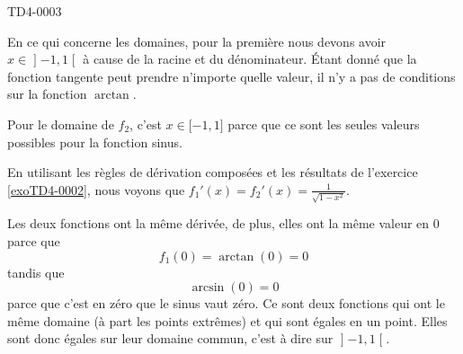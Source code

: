 
\begin{corrige}{TD4-0003}

	En ce qui concerne les domaines, pour la première nous devons avoir $x\in\mathopen] -1 , 1 \mathclose[$ à cause de la racine et du dénominateur. Étant donné que la fonction tangente peut prendre n'importe quelle valeur, il n'y a pas de conditions sur la fonction $\arctan$.

	Pour le domaine de $f_2$, c'est $x\in\mathopen[ -1 , 1 \mathclose]$ parce que ce sont les seules valeurs possibles pour la fonction sinus.

	En utilisant les règles de dérivation composées et les résultats de l'exercice \ref{exoTD4-0002}, nous voyons que $f_1'(x)=f_2'(x)=\frac{1}{ \sqrt{1-x^2} }$.

	Les deux fonctions ont la même dérivée, de plus, elles ont la même valeur en $0$ parce que
	\begin{equation}
		f_1(0)=\arctan(0)=0
	\end{equation}
	tandis que
	\begin{equation}
		\arcsin(0)=0
	\end{equation}
	parce que c'est en zéro que le sinus vaut zéro.	Ce sont deux fonctions qui ont le même domaine (à part les points extrêmes) et qui sont égales en un point. Elles sont donc égales sur leur domaine commun, c'est à dire sur $\mathopen] -1 , 1 \mathclose[$.

\end{corrige}
